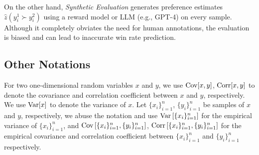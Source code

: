 On the other hand, \emph{Synthetic Evaluation} generates preference estimates $\hat z(y_i^1\succ y_i^2)$ using a reward model or LLM (e.g., GPT-4) \citep{zheng2023judging} on every sample. Although it completely obviates the need for human annotations, the evaluation is biased and can lead to inaccurate win rate prediction. 

\subsection{Other Notations}
For two one-dimensional random variables $x$ and $y$, we use $\mathrm{Cov}[x,y]$, $\operatorname{\mathrm{Corr}}[x,y]$ to denote the covariance and correlation coefficient between $x$ and $y$, respectively. We use $\mathrm{Var}[x]$ to denote the variance of $x$. Let $\{x_i\}_{i=1}^n$, $\{y_i\}_{i=1}^n$ be samples of $x$ and $y$, respectively, we abuse the notation and use $\mathrm{Var}\left[\{x_i\}_{i=1}^n\right]$  for the empirical variance of $\{x_i\}_{i=1}^n$, and $\mathrm{Cov}\left[\{x_i\}_{i=1}^n, \{y_i\}_{i=1}^n \right]$, $\operatorname{\mathrm{Corr}}\left[\{x_i\}_{i=1}^n, \{y_i\}_{i=1}^n \right]$ for the empirical covariance and correlation coefficient between $\{x_i\}_{i=1}^n$ and $\{y_i\}_{i=1}^n$ respectively. 
